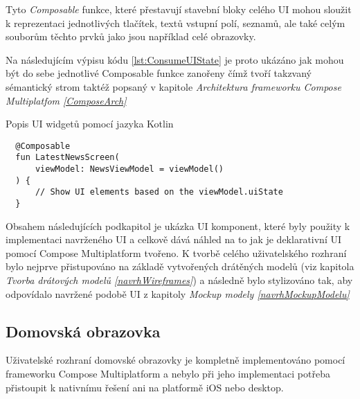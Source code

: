Tyto \textit{Composable} funkce, které přestavují stavební bloky celého UI mohou sloužit k reprezentaci jednotlivých tlačítek, textů vstupní polí, 
seznamů, ale také celým souborům těchto prvků jako jsou například celé obrazovky.

Na následujícím výpisu kódu \ref{lst:ConsumeUIState} je proto ukázáno jak mohou být do sebe jednotlivé Composable funkce zanořeny čímž tvoří
takzvaný sémantický strom taktéž popsaný v kapitole \textit{Architektura frameworku Compose Multiplatfom \ref{ComposeArch}}

\begin{listing}[H]
\caption{Popis UI widgetů pomocí jazyka Kotlin}\label{lst:ConsumeUIState}
\begin{verbatim}
  @Composable
  fun LatestNewsScreen(
      viewModel: NewsViewModel = viewModel()
  ) {
      // Show UI elements based on the viewModel.uiState
  }
\end{verbatim}
\end{listing}



\bigskip

Obsahem následujících podkapitol je ukázka UI komponent, které byly použity k implementaci navrženého UI a celkově dává náhled na to
jak je deklarativní UI pomocí Compose Multiplatform tvořeno. K tvorbě celého uživatelského rozhraní bylo nejprve přistupováno na základě vytvořených 
drátěných modelů (viz kapitola \textit{Tvorba drátových modelů \ref{navrhWireframes}}) a následně bylo stylizováno tak, aby odpovídalo navržené podobě UI z kapitoly \textit{Mockup modely \ref{navrhMockupModelu}}

\subsection{Domovská obrazovka}
Uživatelské rozhraní domovské obrazovky je kompletně implementováno pomocí frameworku Compose Multiplatform a nebylo při jeho implementaci potřeba
přistoupit k nativnímu řešení ani na platformě iOS nebo desktop.

